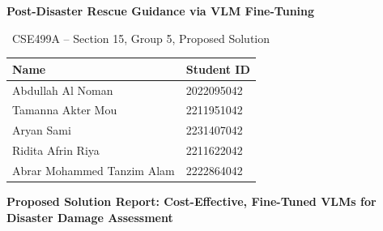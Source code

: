 \documentclass[11pt]{article}
\begin{document}
\noindent\begin{minipage}[t]{0.46\textwidth}
\vspace{-3em}
{\large\bfseries Post-Disaster Rescue Guidance via VLM Fine-Tuning\par}
\vspace{1em}
{\ CSE499A -- Section 15, Group 5, Proposed Solution\par}
\end{minipage}%
\hfill
\begin{minipage}[t]{0.50\textwidth}
\vspace{-4.5em}
\raggedleft
\begin{tabular}{@{}ll@{}}
\toprule
\textbf{Name} & \textbf{Student ID} \\
\midrule
Abdullah Al Noman & 2022095042\\
Tamanna Akter Mou & 2211951042\\
Aryan Sami & 2231407042\\
Ridita Afrin Riya & 2211622042\\
Abrar Mohammed Tanzim Alam & 2222864042\\
\bottomrule
\end{tabular}
\end{minipage}

\vspace{2em}
\begin{center}
    {\Large\bfseries Proposed Solution Report: Cost-Effective, Fine-Tuned VLMs for Disaster Damage Assessment}
\end{center}
\vspace{1em}
\end{document}

